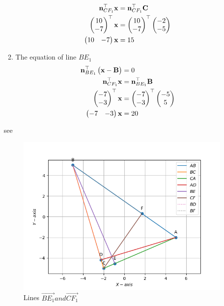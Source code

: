 \documentclass[11pt]{book}
\begin{document}
\begin{enumerate}[label=\thesection.\arabic*.,ref=\thesection.\theenumi]
\begin{enumerate}
\begin{align}
          \mathbf{n}^{\top}_{CF_1}\mathbf{x}&= \mathbf{n}^{\top}_{CF_1}\mathbf{C} \\
          \begin{pmatrix}10 \\-7\end{pmatrix}^{\top}\mathbf{x}&=\begin{pmatrix}10 \\ -7\end{pmatrix}^{\top}\begin{pmatrix}-2 \\ -5\end{pmatrix}\\
          \begin{pmatrix}10 & -7\end{pmatrix}\mathbf{x}&=15
      \end{align}
      \item The equation of line $BE_1$
      \begin{align}
          \mathbf{n}^{\top}_{BE_1}\begin{pmatrix}\mathbf{x}-\mathbf{B}\end{pmatrix}&=0 \\
          \mathbf{n}^{\top}_{CF_1}\mathbf{x}&= \mathbf{n}^{\top}_{BE_1}\mathbf{B} \\
          \begin{pmatrix}-7 \\-3\end{pmatrix}^{\top}\mathbf{x}&=\begin{pmatrix}-7 \\ -3\end{pmatrix}^{\top}\begin{pmatrix}-5 \\ 5\end{pmatrix}\\
          \begin{pmatrix}-7 & -3\end{pmatrix}\mathbf{x}&=20
      \end{align}
  \end{enumerate}
  see 
  \begin{figure}[H]
      \centering
      \includegraphics[width=\columnwidth]{figs/BECF_altitudes.png}
      \caption{Lines $\vec{BE_1} and \vec{CF_1}$}
      \label{fig:line_BE1_CF1}
  \end{figure}
  


\end{enumerate}
\end{document}
